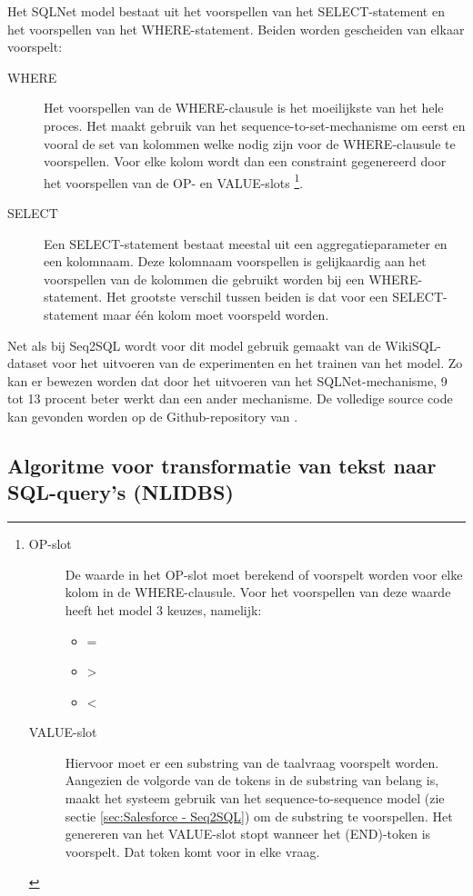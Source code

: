 Het SQLNet model bestaat uit het voorspellen van het SELECT-statement en het voorspellen van het WHERE-statement. Beiden worden gescheiden van elkaar voorspelt:
\begin{description}
	\item[WHERE] Het voorspellen van de WHERE-clausule is het moeilijkste van het hele proces. Het maakt gebruik van het sequence-to-set-mechanisme om eerst en vooral de set van kolommen welke nodig zijn voor de WHERE-clausule te voorspellen. Voor elke kolom wordt dan een constraint gegenereerd door het voorspellen van de OP- en VALUE-slots 
	\footnote{
		\begin{description}
			\item[OP-slot] De waarde in het OP-slot moet berekend of voorspelt worden voor elke kolom in de WHERE-clausule. Voor het voorspellen van deze waarde heeft het model 3 keuzes, namelijk:
			\begin{itemize}
				\item =
				\item >
				\item <
			\end{itemize}
			\item[VALUE-slot] Hiervoor moet er een substring van de taalvraag voorspelt worden. Aangezien de volgorde van de tokens  in de substring van belang is, maakt het systeem gebruik van het sequence-to-sequence model (zie sectie \ref{sec:Salesforce - Seq2SQL}) om de substring te voorspellen. Het genereren van het VALUE-slot stopt wanneer het (END)-token is voorspelt. Dat token komt voor in elke vraag.
		\end{description}
	}.
	\item[SELECT] Een SELECT-statement bestaat meestal uit een aggregatieparameter en een kolomnaam. Deze kolomnaam voorspellen is gelijkaardig aan het voorspellen van de kolommen die gebruikt worden bij een WHERE-statement. Het grootste verschil tussen beiden is dat voor een SELECT-statement maar één kolom moet voorspeld worden.
\end{description}

Net als bij Seq2SQL wordt voor dit model gebruik gemaakt van de WikiSQL-dataset voor het uitvoeren van de experimenten en het trainen van het model. Zo kan er bewezen worden dat door het uitvoeren van het SQLNet-mechanisme, 9 tot 13 procent beter werkt dan een ander mechanisme. De volledige source code kan gevonden worden op de Github-repository van \textcite{sqlnet}.

\subsection{Algoritme voor transformatie van tekst naar SQL-query's (NLIDBS)}

